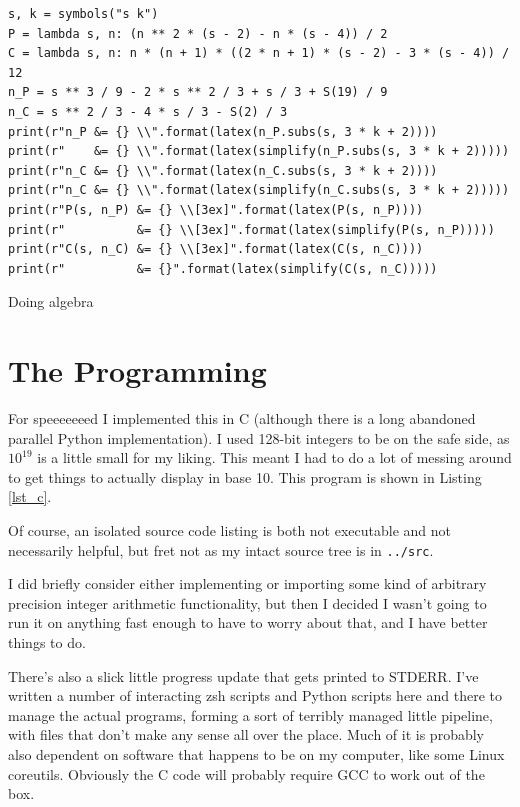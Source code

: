 \begin{longlisting}
\begin{verbatim}
s, k = symbols("s k")
P = lambda s, n: (n ** 2 * (s - 2) - n * (s - 4)) / 2
C = lambda s, n: n * (n + 1) * ((2 * n + 1) * (s - 2) - 3 * (s - 4)) / 12
n_P = s ** 3 / 9 - 2 * s ** 2 / 3 + s / 3 + S(19) / 9
n_C = s ** 2 / 3 - 4 * s / 3 - S(2) / 3
print(r"n_P &= {} \\".format(latex(n_P.subs(s, 3 * k + 2))))
print(r"    &= {} \\".format(latex(simplify(n_P.subs(s, 3 * k + 2)))))
print(r"n_C &= {} \\".format(latex(n_C.subs(s, 3 * k + 2))))
print(r"n_C &= {} \\".format(latex(simplify(n_C.subs(s, 3 * k + 2)))))
print(r"P(s, n_P) &= {} \\[3ex]".format(latex(P(s, n_P))))
print(r"          &= {} \\[3ex]".format(latex(simplify(P(s, n_P)))))
print(r"C(s, n_C) &= {} \\[3ex]".format(latex(C(s, n_C))))
print(r"          &= {}".format(latex(simplify(C(s, n_C)))))
\end{verbatim}
\caption{Doing algebra}\label{lst_sympy_alg}
\end{longlisting}

\section{The Programming}

For speeeeeeed I implemented this in C (although there is a long abandoned
parallel Python implementation). I used 128-bit integers to be on the safe side,
as \(10^{19}\) is a little small for my liking. This meant I had to do a lot of
messing around to get things to actually display in base 10. This program is
shown in Listing \ref{lst_c}.

Of course, an isolated source code listing is both not executable and not
necessarily helpful, but fret not as my intact source tree is in
\texttt{../src}.

I did briefly consider either implementing or importing some kind of arbitrary
precision integer arithmetic functionality, but then I decided I wasn't going to
run it on anything fast enough to have to worry about that, and I have better
things to do.

There's also a slick little progress update that gets printed to STDERR. I've
written a number of interacting zsh scripts and Python scripts here and there to
manage the actual programs, forming a sort of terribly managed little pipeline,
with files that don't make any sense all over the place. Much of it is probably
also dependent on software that happens to be on my computer, like some Linux
coreutils. Obviously the C code will probably require GCC to work out of the
box.

